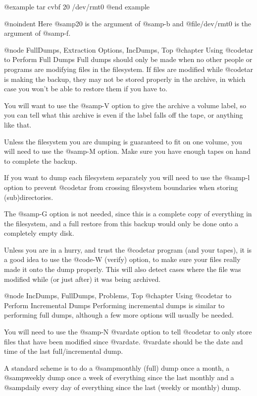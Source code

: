 @example
tar cvbf 20 /dev/rmt0
@end example

@noindent
Here @samp{20} is the argument of @samp{-b} and @file{/dev/rmt0} is the
argument of @samp{-f}.

@node FullDumps, Extraction Options, IncDumps, Top
@chapter Using @code{tar} to Perform Full Dumps
Full dumps should only be made when no other people or programs are
modifying files in the filesystem.  If files are modified while
@code{tar} is making the backup, they may not be stored properly in
the archive, in which case you won't be able to restore them if you
have to.

You will want to use the @samp{-V} option to give the archive a
volume label, so you can tell what this archive is even if the label
falls off the tape, or anything like that.

Unless the filesystem you are dumping is guaranteed to fit on one
volume, you will need to use the @samp{-M} option.  Make sure you
have enough tapes on hand to complete the backup.

If you want to dump each filesystem separately you will need to use
the @samp{-l} option to prevent @code{tar} from crossing filesystem
boundaries when storing (sub)directories.

The @samp{-G} option is not needed, since this is a complete copy of
everything in the filesystem, and a full restore from this backup
would only be done onto a completely empty disk.

Unless you are in a hurry, and trust the @code{tar} program (and
your tapes), it is a good idea to use the @code{-W} (verify) option,
to make sure your files really made it onto the dump properly.  This
will also detect cases where the file was modified while (or just
after) it was being archived.

@node IncDumps, FullDumps, Problems, Top
@chapter Using @code{tar} to Perform Incremental Dumps
Performing incremental dumps is similar to performing full dumps,
although a few more options will usually be needed.

You will need to use the @samp{-N @var{date}} option to tell @code{tar} to
only store files that have been modified since @var{date}.
@var{date} should be the date and time of the last full/incremental
dump.

A standard scheme is to do a @samp{monthly} (full) dump once a month,
a @samp{weekly} dump once a week of everything since the last monthly and
a @samp{daily} every day of everything since the last (weekly or monthly)
dump.

